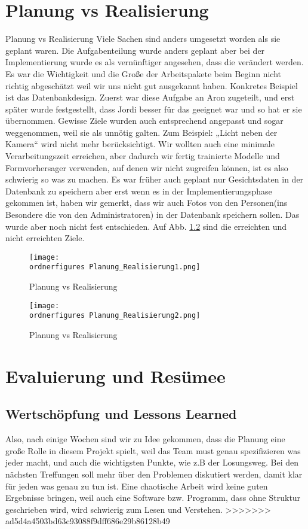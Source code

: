 \chapter{Planung vs Realisierung}
Planung vs Realisierung 
Viele Sachen sind anders umgesetzt worden als sie geplant waren. Die Aufgabenteilung wurde anders geplant aber bei der Implementierung wurde es als vernünftiger angesehen, dass die verändert werden. 
Es war die Wichtigkeit und die Große der Arbeitspakete beim Beginn nicht richtig abgeschätzt weil wir uns nicht gut ausgekannt haben.
Konkretes Beispiel ist das Datenbankdesign. Zuerst war diese Aufgabe an Aron zugeteilt, und erst später wurde festgestellt, dass Jordi besser für das geeignet war und so hat er sie übernommen. 
Gewisse Ziele wurden auch entsprechend angepasst und sogar weggenommen, weil sie als unnötig galten.  Zum Beispiel: „Licht neben der Kamera“ wird nicht mehr berücksichtigt.
Wir wollten auch eine minimale Verarbeitungszeit erreichen, aber dadurch wir fertig trainierte Modelle und Formvorhersager verwenden, auf denen wir nicht zugreifen können, ist es also schwierig so was zu machen. 
Es war früher auch geplant nur Gesichtsdaten in der Datenbank zu speichern aber erst wenn es in der Implementierungsphase gekommen ist, haben wir gemerkt, dass wir auch Fotos von den Personen(ins Besondere die von den Administratoren) in der Datenbank speichern sollen. Das wurde aber noch nicht fest entschieden. Auf Abb. \ref{fig:Planung_Realisierung} sind die erreichten und nicht erreichten Ziele.
\begin{figure}[H]
	\texttt{[image: \\ordnerfigures Planung\_Realisierung1.png]}
	\caption{Planung vs Realisierung}
	\label{fig:Planung_Realisierung}
\end{figure}
\begin{figure}[H]
	\texttt{[image: \\ordnerfigures Planung\_Realisierung2.png]}
	\caption{Planung vs Realisierung}
	\label{fig:Planung_Realisierung}
\end{figure}
\chapter{Evaluierung und Resümee}
\section{Wertschöpfung und Lessons Learned}
Also, nach einige Wochen sind wir zu Idee gekommen, dass die Planung eine große Rolle in diesem Projekt spielt, weil das Team must genau spezifizieren was jeder macht, und auch die wichtigsten Punkte, wie z.B der Losungsweg. Bei den nächsten Treffungen soll mehr über den Problemen diskutiert werden, damit klar für jeden was genau zu tun ist. Eine chaotische Arbeit wird keine guten Ergebnisse bringen, weil auch eine Software bzw. Programm, dass ohne Struktur geschrieben wird, wird schwierig zum Lesen und Verstehen.
>>>>>>> ad5d4a4503bd63c93088f9dff686e29b86128b49
